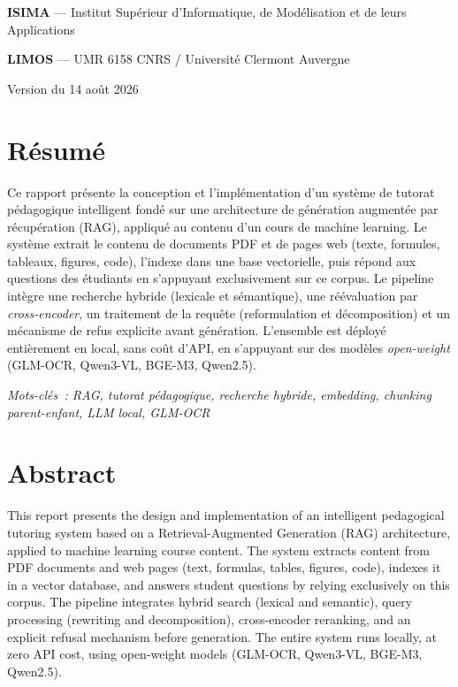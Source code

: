 \documentclass[11pt,a4paper]{article}
\begin{document}
\begin{titlepage}
\vfill

\vspace{1cm}

{\color{bleuPrincipal}\textbf{ISIMA} --- Institut Supérieur d'Informatique, de Modélisation et de leurs Applications\par}
{\color{bleuSecondaire}\textbf{LIMOS} --- UMR 6158 CNRS / Université Clermont Auvergne\par}

{\footnotesize\color{grisTexte}
Version du 14 août 2026
}

\end{titlepage}

\section*{Résumé}

Ce rapport présente la conception et l'implémentation d'un système de tutorat pédagogique intelligent fondé sur une architecture de génération augmentée par récupération (RAG), appliqué au contenu d'un cours de machine learning. Le système extrait le contenu de documents PDF et de pages web (texte, formules, tableaux, figures, code), l'indexe dans une base vectorielle, puis répond aux questions des étudiants en s'appuyant exclusivement sur ce corpus. Le pipeline intègre une recherche hybride (lexicale et sémantique), une réévaluation par \textit{cross-encoder}, un traitement de la requête (reformulation et décomposition) et un mécanisme de refus explicite avant génération. L'ensemble est déployé entièrement en local, sans coût d'API, en s'appuyant sur des modèles \textit{open-weight} (GLM-OCR, Qwen3-VL, BGE-M3, Qwen2.5).

\textit{Mots-clés~: RAG, tutorat pédagogique, recherche hybride, \textit{embedding}, \textit{chunking} parent-enfant, LLM local, GLM-OCR}

\section*{Abstract}

This report presents the design and implementation of an intelligent pedagogical tutoring system based on a Retrieval-Augmented Generation (RAG) architecture, applied to machine learning course content. The system extracts content from PDF documents and web pages (text, formulas, tables, figures, code), indexes it in a vector database, and answers student questions by relying exclusively on this corpus. The pipeline integrates hybrid search (lexical and semantic), query processing (rewriting and decomposition), cross-encoder reranking, and an explicit refusal mechanism before generation. The entire system runs locally, at zero API cost, using open-weight models (GLM-OCR, Qwen3-VL, BGE-M3, Qwen2.5).
\end{document}
